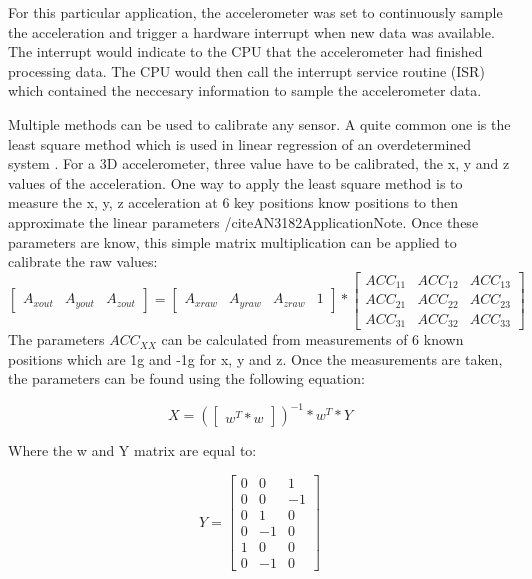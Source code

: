 \documentclass[12pt]{article}
\begin{document}
For this particular application, the accelerometer was set to continuously sample the acceleration and trigger a hardware interrupt when new data was available. The interrupt would indicate to the CPU that the accelerometer had finished processing data. The CPU would then call the interrupt service routine (ISR) which contained the neccesary information to sample the accelerometer data.

Multiple methods can be used to calibrate any sensor. A quite common one is the least square method which is used in linear regression of an overdetermined system \cite{bjorck1996numerical}. For a 3D accelerometer, three value have to be calibrated, the x, y and z values of the acceleration. One way to apply the least square method is to measure the x, y, z acceleration at 6 key positions know positions to then approximate the linear parameters /cite{AN3182ApplicationNote}. Once these parameters are know, this simple matrix multiplication can be applied to calibrate the raw values:
\begin{equation} \label{cal_eq:1}
 \begin{bmatrix}A_{xout} & A_{yout} & A_{zout}\end{bmatrix} = \begin{bmatrix}A_{xraw} & A_{yraw} & A_{zraw} & 1\end{bmatrix} *
\begin{bmatrix}ACC_{11} & ACC_{12} & ACC_{13} \\
ACC_{21} & ACC_{22} & ACC_{23} \\
ACC_{31} & ACC_{32} & ACC_{33} \end{bmatrix}
\end{equation} 
The parameters $ ACC_{XX} $ can be calculated from measurements of 6 known positions which are 1g and -1g for x, y and z. Once the measurements are taken, the parameters can be found using the following equation:

\begin{equation} \label{cal_eq:2}
 X = (\begin{bmatrix} w^{T}*w \end{bmatrix})^{-1}*w^{T} * Y 
 \end{equation}

Where the w and Y matrix are equal to: 

\begin{equation} \label{cal_eq:3}
 Y = \begin{bmatrix} 0 & 0 & 1  \\
					  0 & 0 & -1 \\
                      0 & 1 & 0  \\
                      0 & -1 & 0 \\
                      1 & 0 & 0  \\
                      0 & -1 & 0
                      \end{bmatrix}
\end{equation}
                      
\end{document}

